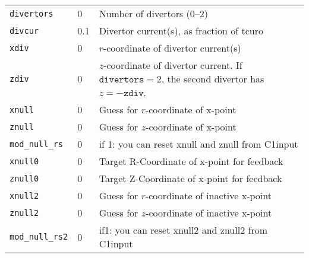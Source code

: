 \begin{tabular}{llp{6in}}
  \texttt{divertors} & 0  & Number of divertors (0--2)\\
  \texttt{divcur}& 0.1    & Divertor current(s), as fraction of tcuro\\
  \texttt{xdiv}  & 0      & $r$-coordinate of divertor current(s)\\
  \texttt{zdiv}  & 0      & \parbox[t]{3in}{$z$-coordinate of 
    divertor 
    current.  If $\mathtt{divertors} = 2$, the second divertor has 
    $z = -\mathtt{zdiv}$.}\\
  \texttt{xnull}     & 0 & Guess for $r$-coordinate of x-point\\
  \texttt{znull}     & 0 & Guess for $z$-coordinate of x-point\\
  \texttt{mod\_null\_rs} & 0 & if 1: you can reset xnull and znull from C1input \\
  \texttt{xnull0}  &  0  & Target R-Coordinate of x-point for feedback \\
  \texttt{znull0}  &  0  & Target Z-Coordinate of x-point for feedback \\
  \texttt{xnull2}     & 0 & Guess for $r$-coordinate of inactive x-point\\
  \texttt{znull2}     & 0 & Guess for $z$-coordinate of inactive x-point\\
  \texttt{mod\_null\_rs2} & 0 & if1: you can reset xnull2 and znull2 from C1input \\
  \end{tabular}

